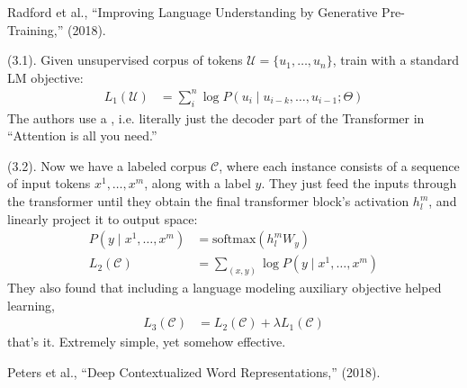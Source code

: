 \documentclass[11pt]{article}
\newcommand\myspace[1][]{\vspace{#1\bigskipamount}}
\newcommand\p{\Needspace{10\baselineskip} \noindent}
\begin{document}
\vspace{-1em}
{\footnotesize Radford et al., ``Improving Language Understanding by Generative Pre-Training,'' (2018).}

\p {} (3.1). Given unsupervised corpus of tokens $\mathcal{U} = \{u_1, \ldots, u_n \}$, train with a standard LM objective:
\begin{align}
	L_1(\mathcal U)
		&= \sum_i^n \log P(u_i \mid u_{i-k}, \ldots, u_{i-1}; \Theta)
\end{align}
The authors use a , i.e. literally just the decoder part of the Transformer in ``Attention is all you need.'' 

\myspace
\p {} (3.2). Now we have a labeled corpus $\mathcal C$, where each instance consists of a sequence of input tokens $x^1, \ldots, x^m$, along with a label $y$. They just feed the inputs through the transformer until they obtain the final transformer block's activation $h_l^m$, and linearly project it to output space:
\begin{align}
	P(y \mid x^1, \ldots, x^m )	
		&= \text{softmax}(h_l^m W_y) \\
	L_2(\mathcal C)
		&= \sum_{(x,y)} \log P(y \mid x^1, \ldots, x^m)
\end{align}
They also found that including a language modeling auxiliary objective helped learning,
\begin{align}
	L_3(\mathcal C)
		&= L_2(\mathcal C) + \lambda L_1(\mathcal C)
\end{align}
\textellipsis that's it. Extremely simple, yet somehow effective.




\vspace{-1em}
{\footnotesize Peters et al., ``Deep Contextualized Word Representations,'' (2018).}
\end{document}
